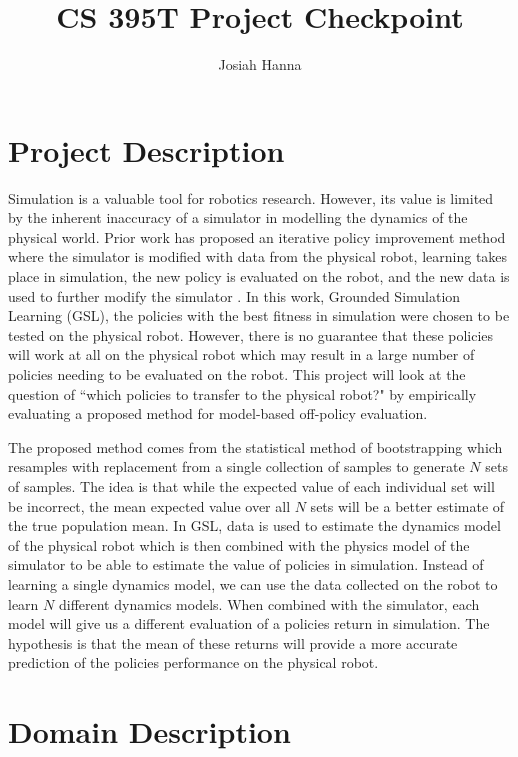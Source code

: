 \documentclass[12 pt]{article}
\author{Josiah Hanna}
\title{CS 395T Project Checkpoint}
\begin{document}

\section{Project Description}

Simulation is a valuable tool for robotics research. However, its value is limited by the inherent inaccuracy of a simulator in modelling the dynamics of the physical world. Prior work has proposed an iterative policy improvement method where the simulator is modified with data from the physical robot, learning takes place in simulation, the new policy is evaluated on the robot, and the new data is used to further modify the simulator \cite{farchy2013humanoid}. In this work, Grounded Simulation Learning (GSL), the policies with the best fitness in simulation were chosen to be tested on the physical robot. However, there is no guarantee that these policies will work at all on the physical robot which may result in a large number of policies needing to be evaluated on the robot. This project will look at the question of ``which policies to transfer to the physical robot?" by empirically evaluating a proposed method for model-based off-policy evaluation.

The proposed method comes from the statistical method of bootstrapping which resamples with replacement from a single collection of samples to generate $N$ sets of samples. The idea is that while the expected value of each individual set will be incorrect, the mean expected value over all $N$ sets will be a better estimate of the true population mean. In GSL, data is used to estimate the dynamics model of the physical robot which is then combined with the physics model of the simulator to be able to estimate the value of policies in simulation. Instead of learning a single dynamics model, we can use the data collected on the robot to learn $N$ different dynamics models. When combined with the simulator, each model will give us a different evaluation of a policies return in simulation. The hypothesis is that the mean of these returns will provide a more accurate prediction of the policies performance on the physical robot.


\section{Domain Description}
\end{document}
